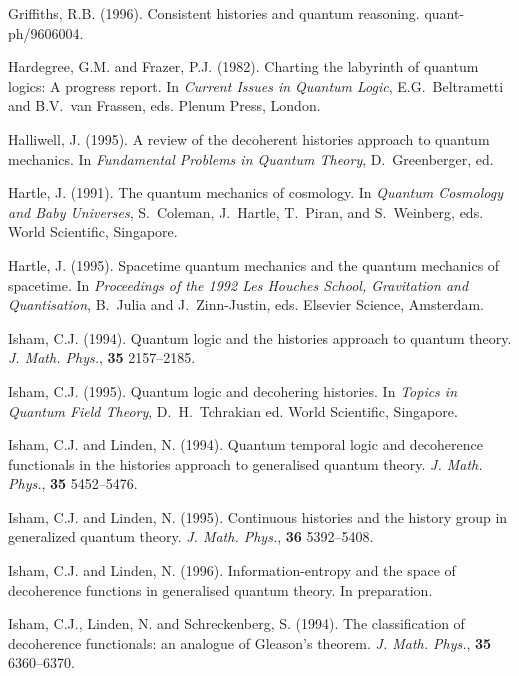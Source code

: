 \begin{trivlist}
\item[] Griffiths, R.B. (1996).
  Consistent histories and quantum reasoning. quant-ph/9606004.

\item[] Hardegree, G.M. and Frazer, P.J. (1982).
  Charting the labyrinth of quantum logics: {A} progress report.
  In {\em Current Issues in Quantum Logic}, E.G.~Beltrametti
  and B.V.~van Frassen, eds. Plenum Press, London.

\item[] Halliwell, J. (1995).
	A review of the decoherent histories approach to quantum
	mechanics. In {\em Fundamental Problems in Quantum Theory},
	D.~Greenberger, ed. 

\item[] Hartle, J. (1991). The quantum mechanics of cosmology.
  In {\em Quantum Cosmology and Baby Universes}, S.~Coleman, J.~Hartle,
  T.~Piran, and S.~Weinberg, eds. World Scientific, Singapore.

\item[] Hartle, J. (1995).
  Spacetime quantum mechanics and the quantum mechanics of spacetime.
  In  {\em Proceedings of the 1992 Les Houches School,
  Gravitation and Quantisation}, B.~Julia and J.~Zinn-Justin, eds.
  Elsevier Science, Amsterdam.

\item[] Isham, C.J. (1994).
  Quantum logic and the histories approach to quantum theory.
  {\em J. Math. Phys.}, {\bf 35} 2157--2185.

\item[] Isham, C.J. (1995). 
  Quantum logic and decohering histories. 
  In {\em Topics in Quantum Field Theory}, D.~H.~Tchrakian ed. 
  World Scientific, Singapore.

\item[] Isham, C.J. and Linden, N. (1994).
  Quantum temporal logic and decoherence functionals in the histories
  approach to generalised quantum theory.
  {\em J. Math. Phys.}, {\bf 35} 5452--5476.

\item[] Isham, C.J. and Linden, N. (1995).
  Continuous histories and the history group in generalized quantum
  theory. {\em J. Math. Phys.}, {\bf 36} 5392--5408.

\item[] Isham, C.J. and Linden, N. (1996).
	Information-entropy and the space of decoherence functions in
	generalised quantum theory.
	In preparation. 

\item[] Isham, C.J., Linden, N. and Schreckenberg, S. (1994).
  The classification of decoherence functionals: an analogue of
  {G}leason's theorem. {\em J. Math. Phys.}, {\bf 35} 6360--6370.


\end{trivlist}
